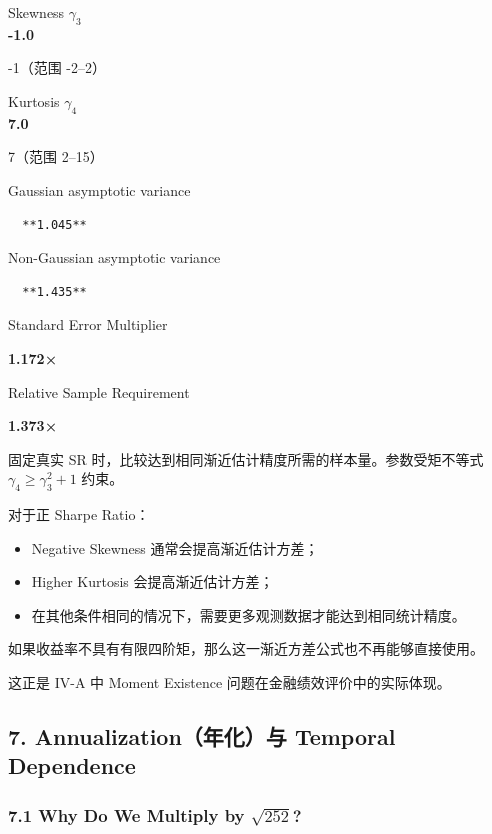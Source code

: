 Skewness \(\gamma_3\)\\
\textbf{-1.0}

-1（范围 -2--2）

Kurtosis \(\gamma_4\)\\
\textbf{7.0}

7（范围 2--15）

Gaussian asymptotic variance

\begin{verbatim}
  **1.045**
\end{verbatim}

Non-Gaussian asymptotic variance

\begin{verbatim}
  **1.435**
\end{verbatim}

Standard Error Multiplier

\textbf{1.172×}

Relative Sample Requirement

\textbf{1.373×}

固定真实 SR 时，比较达到相同渐近估计精度所需的样本量。参数受矩不等式 \(\gamma_4\geq\gamma_3^2+1\) 约束。

对于正 Sharpe Ratio：

\begin{itemize}
\tightlist
\item
  Negative Skewness 通常会提高渐近估计方差；
\item
  Higher Kurtosis 会提高渐近估计方差；
\item
  在其他条件相同的情况下，需要更多观测数据才能达到相同统计精度。
\end{itemize}

如果收益率不具有有限四阶矩，那么这一渐近方差公式也不再能够直接使用。

这正是 IV-A 中 Moment Existence 问题在金融绩效评价中的实际体现。

\hypertarget{part-4-67-0001-annualizationux5e74ux5316ux4e0e-temporal-dependence}{%
\subsection{7. Annualization（年化）与 Temporal Dependence}\label{part-4-67-0001-annualizationux5e74ux5316ux4e0e-temporal-dependence}}

\hypertarget{part-4-67-0001-why-do-we-multiply-by-sqrt252}{%
\subsubsection{\texorpdfstring{7.1 Why Do We Multiply by \(\sqrt{252}\)?}{7.1 Why Do We Multiply by \textbackslash sqrt\{252\}?}}\label{part-4-67-0001-why-do-we-multiply-by-sqrt252}}

